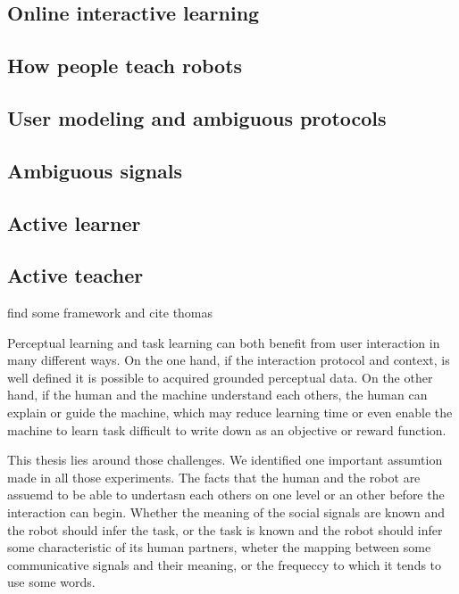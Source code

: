 \subsection{Online interactive learning}

\subsection{How people teach robots}

\subsection{User modeling and ambiguous protocols}

\cite{macl11simul}

\subsection{Ambiguous signals}

\subsection{Active learner}

\subsection{Active teacher}



find some framework and cite thomas \cite{cederborg2013language}

Perceptual learning and task learning can both benefit from user interaction in many different ways. On the one hand, if the interaction protocol and context, is well defined it is possible to acquired grounded perceptual data. On the other hand, if the human and the machine understand each others, the human can explain or guide the machine, which may reduce learning time or even enable the machine to learn task difficult to write down as an objective or reward function.




This thesis lies around those challenges. We identified one important assumtion made in all those experiments. The facts that the human and the robot are assuemd to be able to undertasn each others on one level or an other before the interaction can begin. Whether the meaning of the social signals are known and the robot should infer the task, or the task is known and the robot should infer some characteristic of its human partners, wheter the mapping between some communicative signals and their meaning, or the frequeccy to which it tends to use some words.

